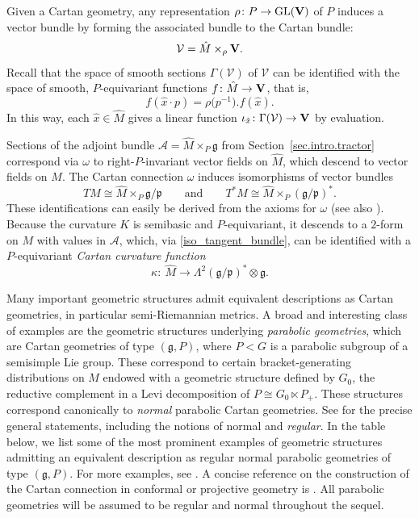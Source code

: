 \documentclass[pdftex]{sigma}
\numberwithin{equation}{section}
\theoremstyle{definition}
\newcommand{\lieg}{\mathfrak{g}}
\def\g{{\mathfrak g}}
\def\p{{\mathfrak p}}
\begin{document}
 Given a Cartan geometry, any representation $\rho\colon P\rightarrow\textrm{GL}({\bf V})$ of $P$ induces
 a vector bundle by forming the associated bundle to the Cartan bundle:
 \[
 \mathcal V =\hat{M} \times_\rho {\bf V}.
 \]
 Recall that the space of smooth sections $\Gamma(\mathcal V)$ of $\mathcal V$ can be identified with the space  of smooth, $P$-equivariant functions $f\colon \hat{M}\rightarrow {\bf V}$, that is,
 \[f(\hat{x}\cdot p)= {\rho\bigl(p^{-1}\bigr). f(\hat{x})}.\]
 In this way, each $\hat{x} \in \hat{M}$ gives a linear function $\iota_{\hat{x}}\colon \Gamma(\mathcal{V}) \rightarrow {\bf V}$ by evaluation.

 Sections of the adjoint bundle $\mathcal{A} = \hat{M} \times_P \lieg$ from Section~\ref{sec.intro.tractor} correspond via $\omega$ to right-$P$-invariant vector fields on $\hat{M}$, which descend to vector fields on $M$.
The Cartan connection $\omega$ induces isomorphisms of vector bundles
 \begin{equation}\label{iso_tangent_bundle}
 TM\cong \hat{M} \times_P \g/\p\qquad\textrm{and}\qquad T^*M\cong \hat{M} \times_P (\g/\p)^*.
 \end{equation}
 These identifications can easily be derived from the axioms for $\omega$ (see also \cite[Theorem~5.3.15]{sharpe}).
 Because the curvature $K$ is semibasic and $P$-equivariant, it
 descends to a $2$-form on $M$ with values in $\mathcal{A}$, which, via \eqref{iso_tangent_bundle}, can be identified with a $P$-equivariant \emph{Cartan curvature function}
 \begin{equation*}
 \kappa\colon\ \hat{M} \rightarrow\Lambda^2 (\g/\p)^*\otimes \g.%
 \end{equation*}

Many important geometric structures admit equivalent descriptions as Cartan geometries, in particular semi-Riemannian metrics. A broad and interesting class of examples are the geometric structures underlying \emph{parabolic geometries}, which are Cartan geometries of type $(\g,P)$, where $P<G$ is a parabolic subgroup of a semisimple Lie group.
These correspond to certain bracket-generating distributions on $M$ endowed with a geometric structure defined by $G_0$, the reductive complement in a Levi decomposition of $P \cong G_0 \ltimes P_+$. These structures correspond canonically to \emph{normal} parabolic Cartan geometries. See \cite{cap.schichl.equiv,morimoto,tanaka} for the precise general statements, including the notions of normal and \emph{regular}.
In the table below, we list some of the most prominent examples of geometric structures admitting an equivalent description as regular normal parabolic geometries of type $(\g,P)$. For more examples, see \cite{cap.slovak.book.vol1}. A concise reference on the construction
of the Cartan connection in conformal or projective geometry is \cite[Section IV]{kobayashi.transf}. All parabolic geometries will be assumed to be regular and normal throughout the sequel.
\end{document}
